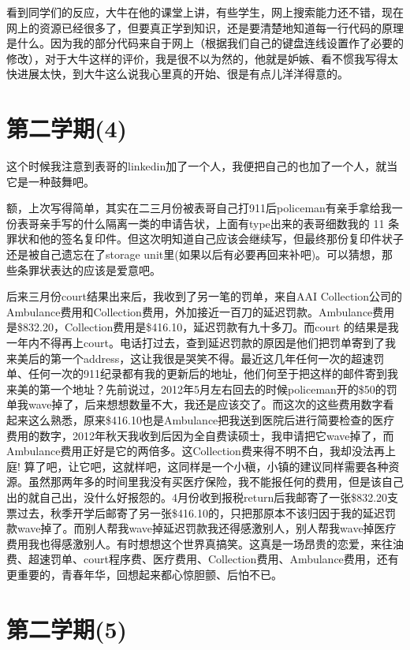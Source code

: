 \documentclass[12pt]{book}
\begin{document}
看到同学们的反应，大牛在他的课堂上讲，有些学生，网上搜索能力还不错，现在网上的资源已经很多了，但要真正学到知识，还是要清楚地知道每一行代码的原理是什么。因为我的部分代码来自于网上（根据我们自己的键盘连线设置作了必要的修改），对于大牛这样的评价，我是很不以为然的，他就是妒嫉、看不惯我写得太快进展太快，到大牛这么说我心里真的开始、很是有点儿洋洋得意的。

\section{第二学期(4)}
\label{sec-4-4}

这个时候我注意到表哥的linkedin加了一个人，我便把自己的也加了一个人，就当它是一种鼓舞吧。

额，上次写得简单，其实在二三月份被表哥自己打911后policeman有亲手拿给我一份表哥亲手写的什么隔离一类的申请告状，上面有type出来的表哥细数我的 11 条罪状和他的签名复印件。但这次明知道自己应该会继续写，但最终那份复印件状子还是被自己遗忘在了storage unit里(如果以后有必要再回来补吧)。可以猜想，那些条罪状表达的应该是爱意吧。

后来三月份court结果出来后，我收到了另一笔的罚单，来自AAI Collection公司的Ambulance费用和Collection费用，外加接近一百刀的延迟罚款。Ambulance费用是\$832.20，Collection费用是\$416.10，延迟罚款有九十多刀。而court 的结果是我一年内不得再上court。电话打过去，查到延迟罚款的原因是他们把罚单寄到了我来美后的第一个address，这让我很是哭笑不得。最近这几年任何一次的超速罚单、任何一次的911纪录都有我的更新后的地址，他们何至于把这样的邮件寄到我来美的第一个地址？先前说过，2012年5月左右回去的时候policeman开的\$50的罚单我wave掉了，后来想想数量不大，我还是应该交了。而这次的这些费用数字看起来这么熟悉，原来\$416.10也是Ambulance把我送到医院后进行简要检查的医疗费用的数字，2012年秋天我收到后因为全自费读硕士，我申请把它wave掉了，而Ambulance费用正好是它的两倍多。这Collection费来得不明不白，我却没法再上庭! 算了吧，让它吧，这就样吧，这同样是一个小稹，小镇的建议同样需要各种资源。虽然那两年多的时间里我没有买医疗保险，我不能报任何的费用，但是该自己出的就自己出，没什么好报怨的。4月份收到报税return后我邮寄了一张\$832.20支票过去，秋季开学后邮寄了另一张\$416.10的，只把那原本不该归因于我的延迟罚款wave掉了。而别人帮我wave掉延迟罚款我还得感激别人，别人帮我wave掉医疗费用我也得感激别人。有时想想这个世界真搞笑。这真是一场昂贵的恋爱，来往油费、超速罚单、court程序费、医疗费用、Collection费用、Ambulance费用，还有更重要的，青春年华，回想起来都心惊胆颤、后怕不已。

\section{第二学期(5)}
\label{sec-4-5}
\end{document}

